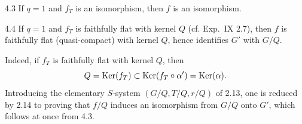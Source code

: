 \begin{corollary}{4.3}\label{XX.4.3}
If $q=1$ and $f_T$ is an isomorphism, then $f$ is an isomorphism.
\end{corollary}
\begin{corollary}{4.4}\label{XX.4.4}
If $q=1$ and $f_T$ is faithfully flat with kernel $Q$ (cf. Exp.~IX 2.7), then $f$ is faithfully flat (quasi-compact) with kernel $Q$, hence identifies $G'$ with $G/Q$.
\end{corollary}
Indeed, if $f_T$ is faithfully flat with kernel $Q$, then
\[
Q=\operatorname{Ker}(f_T)\subset\operatorname{Ker}(f_T\circ\alpha')=\operatorname{Ker}(\alpha).
\]
Introducing the elementary $S$-system $(G/Q,T/Q,r/Q)$ of 2.13, one is reduced by 2.14 to proving that $f/Q$ induces an isomorphism from $G/Q$ onto $G'$, which follows at once from 4.3.
